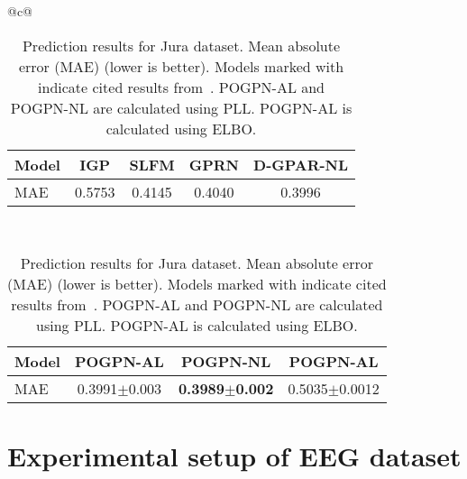 \begin{table}[h]
      \centering
      \begin{tabular}{@{}c@{}}
            \begin{tabular}{@{\hskip 0pt}lcccc@{\hskip 0pt}}
                  \toprule
                  Model & IGP\textsuperscript{\textdagger} & SLFM\textsuperscript{\textdagger} & GPRN\textsuperscript{\textdagger} & D-GPAR-NL\textsuperscript{\textdagger} \\
                  \midrule
                  MAE   & 0.5753                           & 0.4145                            & 0.4040                            & 0.3996                                 \\
                  \bottomrule
            \end{tabular}
            \\[2em] %

            \begin{tabular}{@{\hskip 0pt}lccc@{\hskip 0pt}}
                  \toprule
                  Model & POGPN-AL\textsuperscript{\textdaggerdbl} & POGPN-NL\textsuperscript{\textdaggerdbl} & POGPN-AL\textsuperscript{\textasteriskcentered} \\
                  \midrule
                  MAE   & 0.3991$\pm$0.003
                        & \textbf{0.3989}$\pm$\textbf{0.002}       & 0.5035$\pm$0.0012                                                                          \\
                  \bottomrule
            \end{tabular}
      \end{tabular}
      \caption{Prediction results for Jura dataset. Mean absolute error (MAE) (lower is better). Models marked with \textsuperscript{\textdagger} indicate cited results from~\cite{requeima2019gaussian}. POGPN-AL\textsuperscript{\textdaggerdbl} and POGPN-NL\textsuperscript{\textdaggerdbl} are calculated using PLL. POGPN-AL\textsuperscript{\textasteriskcentered} is calculated using ELBO.}
      \vspace{-1em}
\end{table}

\section{Experimental setup of EEG dataset}

